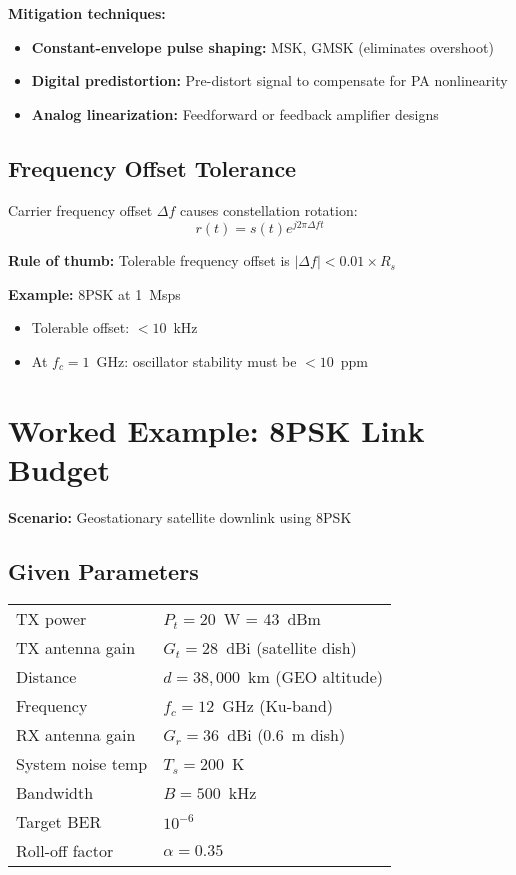 \textbf{Mitigation techniques:}
\begin{itemize}
\item \textbf{Constant-envelope pulse shaping:} MSK, GMSK (eliminates overshoot)
\item \textbf{Digital predistortion:} Pre-distort signal to compensate for PA nonlinearity
\item \textbf{Analog linearization:} Feedforward or feedback amplifier designs
\end{itemize}

\subsection{Frequency Offset Tolerance}

Carrier frequency offset $\Delta f$ causes constellation rotation:
\begin{equation}
r(t) = s(t)e^{j2\pi\Delta f t}
\end{equation}

\textbf{Rule of thumb:} Tolerable frequency offset is $|\Delta f| < 0.01 \times R_s$

\textbf{Example:} 8PSK at 1~Msps
\begin{itemize}
\item Tolerable offset: $< 10$~kHz
\item At $f_c = 1$~GHz: oscillator stability must be $< 10$~ppm
\end{itemize}

\section{Worked Example: 8PSK Link Budget}

\textbf{Scenario:} Geostationary satellite downlink using 8PSK

\subsection*{Given Parameters}

\begin{tabular}{@{}ll@{}}
TX power & $P_t = 20$~W = 43~dBm \\
TX antenna gain & $G_t = 28$~dBi (satellite dish) \\
Distance & $d = 38{,}000$~km (GEO altitude) \\
Frequency & $f_c = 12$~GHz (Ku-band) \\
RX antenna gain & $G_r = 36$~dBi (0.6~m dish) \\
System noise temp & $T_s = 200$~K \\
Bandwidth & $B = 500$~kHz \\
Target BER & $10^{-6}$ \\
Roll-off factor & $\alpha = 0.35$ \\
\end{tabular}

